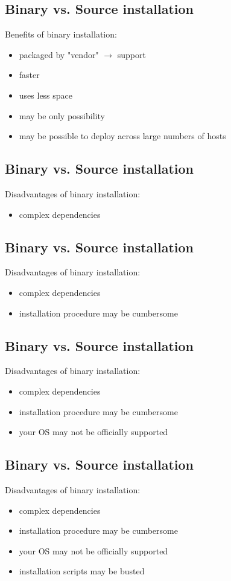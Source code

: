 \documentclass[xga]{xdvislides}
\begin{document}
\subsection{Binary vs. Source installation}
Benefits of binary installation:
\begin{itemize}
	\item packaged by "vendor" $\rightarrow$ support
	\item faster
	\item uses less space
	\item may be only possibility
	\item may be possible to deploy across large numbers of hosts
\end{itemize}

\subsection{Binary vs. Source installation}
Disadvantages of binary installation:
\begin{itemize}
	\item complex dependencies
\end{itemize}

\subsection{Binary vs. Source installation}
Disadvantages of binary installation:
\begin{itemize}
	\item complex dependencies
	\item installation procedure may be cumbersome
\end{itemize}

\subsection{Binary vs. Source installation}
Disadvantages of binary installation:
\begin{itemize}
	\item complex dependencies
	\item installation procedure may be cumbersome
	\item your OS may not be officially supported
\end{itemize}

\subsection{Binary vs. Source installation}
Disadvantages of binary installation:
\begin{itemize}
	\item complex dependencies
	\item installation procedure may be cumbersome
	\item your OS may not be officially supported
	\item installation scripts may be busted
\end{itemize}
\end{document}
